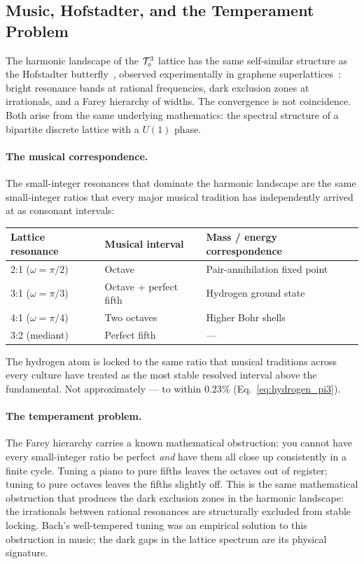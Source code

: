 \subsection{Music, Hofstadter, and the Temperament Problem}
\label{subsec:music_hofstadter}

The harmonic landscape of the $\mathcal{T}_\diamond^3$ lattice has the same
self-similar structure as the Hofstadter
butterfly~\cite{hofstadter1976}, observed experimentally in graphene
superlattices~\cite{dean2013}: bright resonance bands at rational
frequencies, dark exclusion zones at irrationals, and a Farey
hierarchy of widths. The convergence is not coincidence. Both
arise from the same underlying mathematics: the spectral structure
of a bipartite discrete lattice with a $U(1)$ phase.

\paragraph{The musical correspondence.}
The small-integer resonances that dominate the harmonic landscape
are the same small-integer ratios that every major musical
tradition has independently arrived at as consonant intervals:
\begin{center}
\renewcommand{\arraystretch}{1.15}
\begin{tabular}{lll}
\hline
Lattice resonance & Musical interval & Mass / energy correspondence \\
\hline
2:1 ($\omega = \pi/2$) & Octave & Pair-annihilation fixed point \\
3:1 ($\omega = \pi/3$) & Octave + perfect fifth & Hydrogen ground state \\
4:1 ($\omega = \pi/4$) & Two octaves & Higher Bohr shells \\
3:2 (mediant)         & Perfect fifth & --- \\
\hline
\end{tabular}
\end{center}
The hydrogen atom is locked to the same ratio that musical
traditions across every culture have treated as the most stable
resolved interval above the fundamental. Not approximately --- to
within $0.23\%$ (Eq.~\ref{eq:hydrogen_pi3}).

\paragraph{The temperament problem.}
The Farey hierarchy carries a known mathematical obstruction: you
cannot have every small-integer ratio be perfect \emph{and} have
them all close up consistently in a finite cycle. Tuning a piano to
pure fifths leaves the octaves out of register; tuning to pure
octaves leaves the fifths slightly off. This is the same mathematical
obstruction that produces the dark exclusion zones in the harmonic
landscape: the irrationals between rational resonances are
structurally excluded from stable locking. Bach's well-tempered
tuning was an empirical solution to this obstruction in music;
the dark gaps in the lattice spectrum are its physical signature.


